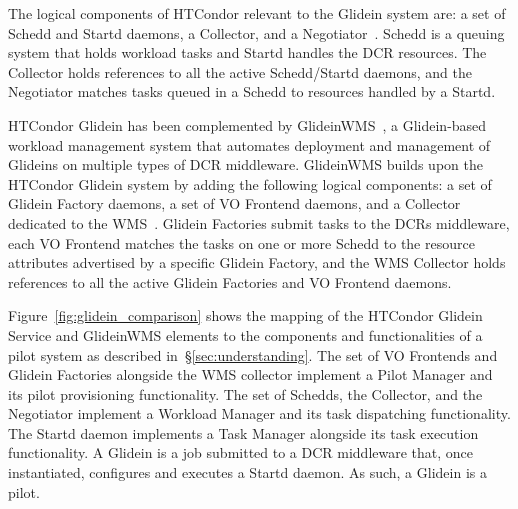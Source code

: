 \documentclass{sig-alternate}
\begin{document}

The logical components of HTCondor relevant to the Glidein system are: a set of
Schedd and Startd daemons, a Collector, and a
Negotiator~\cite{glidein_presentation_url}. Schedd is a queuing system that
holds workload tasks and Startd handles the DCR resources. The Collector holds
references to all the active Schedd/Startd daemons, and the Negotiator matches
tasks queued in a Schedd to resources handled by a Startd.

HTCondor Glidein has been complemented by
GlideinWMS~\cite{sfiligoi2008glideinwms}, a Glidein-based workload management
system that automates deployment and management of Glideins on multiple types of
DCR middleware. GlideinWMS builds upon the HTCondor Glidein system by adding the
following logical components: a set of Glidein Factory daemons, a set of VO
Frontend daemons, and a Collector dedicated to the
WMS~\cite{glideinwms_url,glideinwms_manual_url}. Glidein Factories submit tasks
to the DCRs middleware, each VO Frontend matches the tasks on one or more Schedd
to the resource attributes advertised by a specific Glidein Factory, and the WMS
Collector holds references to all the active Glidein Factories and VO Frontend
daemons.


Figure~\ref{fig:glidein_comparison} shows the mapping of the HTCondor Glidein
Service and GlideinWMS elements to the components and functionalities of a pilot
system as described in~\S\ref{sec:understanding}. The set of VO Frontends and
Glidein Factories alongside the WMS collector implement a Pilot Manager and its
pilot provisioning functionality. The set of Schedds, the Collector, and the
Negotiator implement a Workload Manager and its task dispatching functionality.
The Startd daemon implements a Task Manager alongside its task execution
functionality. A Glidein is a job submitted to a DCR middleware that, once
instantiated, configures and executes a Startd daemon. As such, a Glidein is a
pilot.
\end{document}
